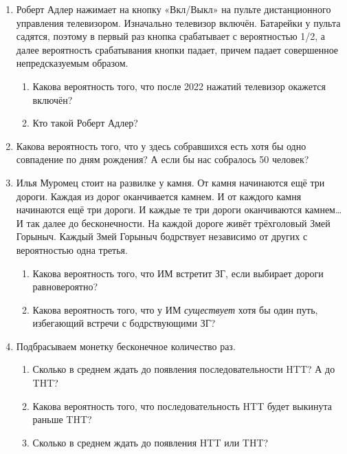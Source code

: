 \documentclass[12pt]{article}
\theoremstyle{definition}
\begin{document}
\begin{enumerate}
  \item Роберт Адлер нажимает на кнопку «Вкл/Выкл» на пульте дистанционного
управления телевизором. Изначально телевизор включён. Батарейки
у пульта садятся, поэтому в первый раз кнопка срабатывает с вероятностью
1/2, а далее вероятность срабатывания кнопки падает, причем падает совершенное непредсказуемым образом. 

\begin{enumerate}
  \item Какова вероятность того, что после 2022 нажатий телевизор окажется включён?
  \item Кто такой Роберт Адлер?
\end{enumerate}

\item Какова вероятность того, что у здесь собравшихся есть хотя бы одно совпадение по дням рождения?
А если бы нас собралось 50 человек?

\item Илья Муромец стоит на развилке у камня. От камня начинаются
ещё три дороги. Каждая из дорог оканчивается камнем.
И от каждого камня начинаются ещё три дороги. И каждые те три
дороги оканчиваются камнем\ldots И так далее до бесконечности. На
каждой дороге живёт трёхголовый Змей Горыныч. Каждый Змей
Горыныч бодрствует независимо от других с вероятностью одна третья. 

\begin{enumerate}
  \item Какова вероятность того, что ИМ встретит ЗГ, если выбирает дороги равновероятно?
  \item Какова вероятность того, что у ИМ \textit{существует} хотя бы один путь, избегающий встречи с бодрствующими ЗГ?
\end{enumerate}

\item Подбрасываем монетку бесконечное количество раз. 
\begin{enumerate}
  \item Сколько в среднем ждать до появления последовательности HTT? А до THT? 
  \item Какова вероятность того, что последовательность HTT будет выкинута раньше THT?
  \item Сколько в среднем ждать до появления HTT или THT?
\end{enumerate}


\end{enumerate}
\end{document}
